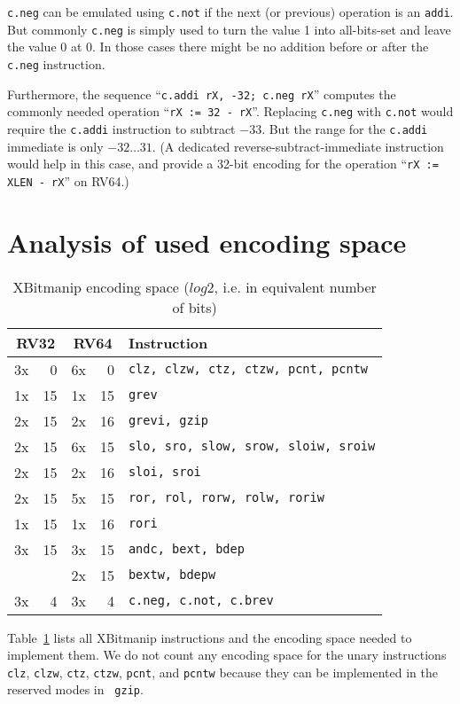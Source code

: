{\tt c.neg} can be emulated using {\tt c.not} if the next (or previous) operation
is an {\tt addi}. But commonly {\tt c.neg} is simply used to turn the value 1
into all-bits-set and leave the value 0 at 0. In those cases there might be
no addition before or after the {\tt c.neg} instruction.

Furthermore, the sequence ``{\tt c.addi rX, -32; c.neg rX}'' computes the commonly
needed operation ``{\tt rX := 32 - rX}''. Replacing {\tt c.neg} with {\tt c.not}
would require the {\tt c.addi} instruction to subtract $-33$. But the range for
the {\tt c.addi} immediate is only $-32 \dots 31$. (A dedicated reverse-subtract-immediate
instruction would help in this case, and provide a 32-bit encoding for the
operation ``{\tt rX := \rm XLEN \tt - rX}'' on RV64.)

\section{Analysis of used encoding space}

\begin{table}
\begin{center}
\begin{tabular}{rr|rr|l}
\multicolumn{2}{c|}{RV32} & \multicolumn{2}{c|}{RV64} & Instruction \\
\hline
3x &  0 & 6x &  0 & {\tt clz, clzw, ctz, ctzw, pcnt, pcntw} \\
\hline
1x & 15 & 1x & 15 & {\tt grev} \\
2x & 15 & 2x & 16 & {\tt grevi, gzip} \\
\hline
2x & 15 & 6x & 15 & {\tt slo, sro, slow, srow, sloiw, sroiw} \\
2x & 15 & 2x & 16 & {\tt sloi, sroi} \\
\hline
2x & 15 & 5x & 15 & {\tt ror, rol, rorw, rolw, roriw} \\
1x & 15 & 1x & 16 & {\tt rori} \\
\hline
3x & 15 & 3x & 15 & {\tt andc, bext, bdep} \\
   &    & 2x & 15 & {\tt bextw, bdepw} \\
\hline
3x &  4 & 3x &  4 & {\tt c.neg, c.not, c.brev} \\
\end{tabular}
\end{center}
\caption{XBitmanip encoding space ($log2$, i.e. in equivalent number of bits)}
\label{encspace-tab}
\end{table}

Table~\ref{encspace-tab} lists all XBitmanip instructions and the encoding
space needed to implement them.  We do not count any encoding space for the
unary instructions {\tt clz}, {\tt clzw}, {\tt ctz}, {\tt ctzw}, {\tt pcnt},
and {\tt pcntw} because they can be implemented in the reserved modes in {\tt
gzip}.

